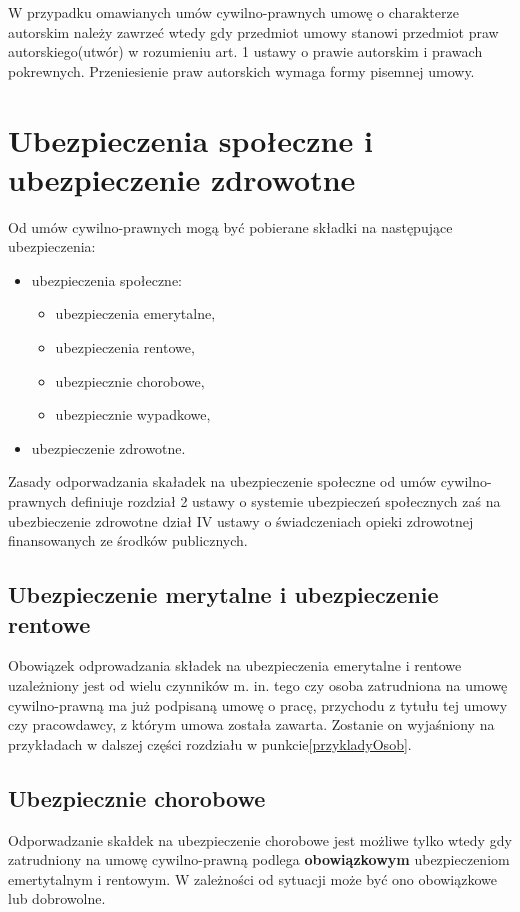 W przypadku omawianych umów cywilno-prawnych umowę o charakterze autorskim należy zawrzeć wtedy gdy przedmiot umowy stanowi przedmiot praw autorskiego(utwór) w rozumieniu art. 1 ustawy o prawie autorskim i prawach pokrewnych\cite{TODO}. Przeniesienie praw autorskich wymaga formy pisemnej umowy.

\section[Ubezpieczenia społeczne i ubezpieczenie zdrowotne][Ubezpieczenia społeczne i ubezpieczenie zdrowotne]{Ubezpieczenia społeczne i ubezpieczenie zdrowotne}
Od umów cywilno-prawnych mogą być pobierane składki na następujące ubezpieczenia:
\begin{itemize}
	\item ubezpieczenia społeczne:
	\begin{itemize}
		\item ubezpieczenia emerytalne,
		\item ubezpieczenia rentowe,
		\item ubezpiecznie chorobowe,
		\item ubezpiecznie wypadkowe,
	\end{itemize}
	\item ubezpieczenie zdrowotne.
\end{itemize}
Zasady odporwadzania skaładek na ubezpieczenie społeczne od umów cywilno-prawnych definiuje rozdział 2 ustawy o systemie ubezpieczeń społecznych\cite{TODO} zaś na ubezbieczenie zdrowotne dział IV ustawy o świadczeniach opieki zdrowotnej finansowanych ze środków publicznych\cite{TODO}.

\subsection[Ubezpieczenie merytalne i ubezpieczenie rentowe][Ubezpieczenie merytalne i ubezpieczenie rentowe]{Ubezpieczenie merytalne i ubezpieczenie rentowe}
Obowiązek odprowadzania składek na ubezpieczenia emerytalne i rentowe uzależniony jest od wielu czynników m. in. tego czy osoba zatrudniona na umowę cywilno-prawną ma już podpisaną umowę o pracę, przychodu z tytułu tej umowy czy pracowdawcy, z którym umowa została zawarta. Zostanie on wyjaśniony na przykładach w dalszej części rozdziału w punkcie\ref{przykladyOsob}.

\subsection[Ubezpiecznie chorobowe][Ubezpiecznie chorobowe]{Ubezpiecznie chorobowe}
Odporwadzanie skałdek na ubezpieczenie chorobowe jest możliwe tylko wtedy gdy zatrudniony na umowę cywilno-prawną podlega \textbf{obowiązkowym} ubezpieczeniom emertytalnym i rentowym. W zależności od sytuacji może być ono obowiązkowe lub dobrowolne.

